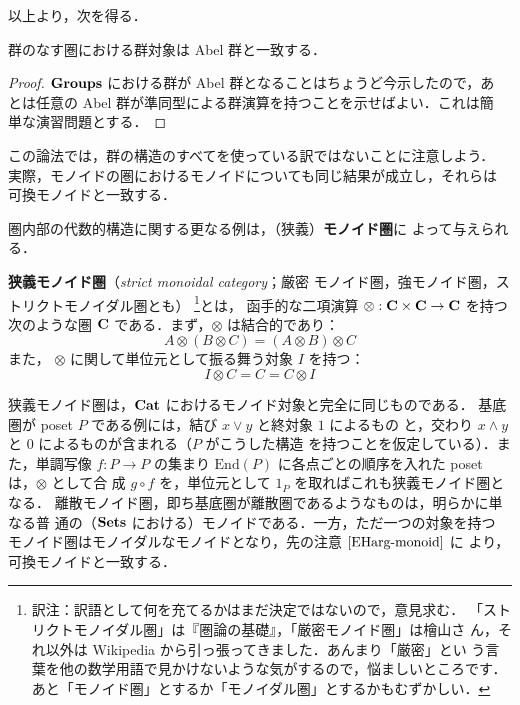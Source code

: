以上より，次を得る．
\begin{corollary}
 群のなす圏における群対象は Abel 群と一致する．
\end{corollary}
\begin{proof}
 ${\bf Groups}$ における群が Abel 群となることはちょうど今示したので，あ
 とは任意の Abel 群が準同型による群演算を持つことを示せばよい．これは簡
 単な演習問題とする．
\end{proof}

\begin{remark}\label{EHarg-monoid}
 この論法では，群の構造のすべてを使っている訳ではないことに注意しよう．
 実際，モノイドの圏におけるモノイドについても同じ結果が成立し，それらは
 可換モノイドと一致する．
\end{remark}

\begin{example}
 圏内部の代数的構造に関する更なる例は，（狭義）{\bfseries モノイド圏}に
 よって与えられる．
 \begin{definition}
  {\bfseries 狭義モノイド圏}（{\itshape strict monoidal category}；厳密
  モノイド圏，強モノイド圏，ストリクトモノイダル圏とも）
  \footnote{訳注：訳語として何を充てるかはまだ決定ではないので，意見求む．
  「ストリクトモノイダル圏」は『圏論の基礎』，「厳密モノイド圏」は檜山さ
  ん，それ以外は Wikipedia から引っ張ってきました．あんまり「厳密」とい
  う言葉を他の数学用語で見かけないような気がするので，悩ましいところです．
  あと「モノイド圏」とするか「モノイダル圏」とするかもむずかしい．}とは，
  函手的な二項演算 $\otimes: {\bf C} \times {\bf C} \to {\bf C}$ を持つ
  次のような圏 ${\bf C}$ である．まず，$\otimes$ は結合的であり：
  \begin{equation}
   A \otimes (B \otimes C) = (A \otimes B) \otimes C\label{Mon:Assoc}
  \end{equation}
  また， $\otimes$ に関して単位元として振る舞う対象 $I$ を持つ：
  \begin{equation}
   I \otimes C = C = C \otimes I\label{Mon:Unit}
  \end{equation}
 \end{definition}
\end{example}

狭義モノイド圏は，${\bf Cat}$ におけるモノイド対象と完全に同じものである．
基底圏が poset $P$ である例には，結び $x \vee y$ と終対象 $1$ によるもの
と，交わり $x \wedge y$ と $0$ によるものが含まれる（$P$ がこうした構造
を持つことを仮定している）．また，単調写像 $f: P \to P$ の集まり
$\mathrm{End}(P)$ に各点ごとの順序を入れた poset は，$\otimes$ として合
成 $g \circ f$ を，単位元として $1_P$ を取ればこれも狭義モノイド圏となる．
離散モノイド圏，即ち基底圏が離散圏であるようなものは，明らかに単なる普
通の（$\mathbf{Sets}$ における）モノイドである．一方，ただ一つの対象を持つ
モノイド圏はモノイダルなモノイドとなり，先の注意 $\ref{EHarg-monoid}$ に
より，可換モノイドと一致する．

